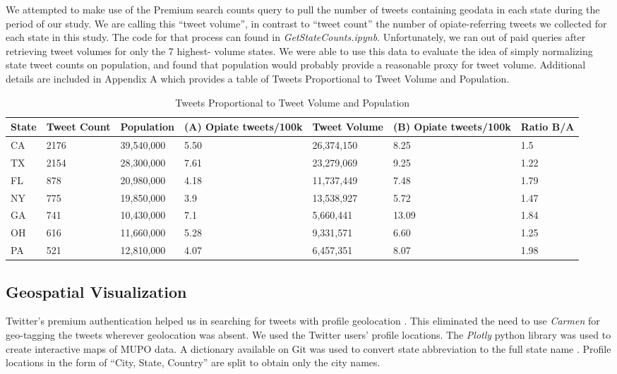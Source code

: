 \documentclass[sigconf]{acmart}
\begin{document}
We attempted to make use of the Premium search counts query to pull the number 
of tweets containing geodata in each state during the period of our study. 
We are calling this ``tweet volume'', in contrast to ``tweet count'' the number 
of opiate-referring tweets we collected for each state in this study. The code 
for that process can found in \emph{GetStateCounts.ipynb}. Unfortunately, we 
ran out of paid queries after retrieving tweet volumes for only the 7 highest-
volume states. We were able to use this data to evaluate the idea of simply 
normalizing state tweet counts on population, and found that population would 
probably provide a reasonable proxy for tweet volume. Additional details are 
included in Appendix A which provides a table of Tweets Proportional to Tweet 
Volume and Population.

\begin{table}[ht]
\centering
\caption{Tweets Proportional to Tweet Volume and Population}
\label{tab:1}
  \begin{tabular}{lllllll}
    \toprule
    State & Tweet Count & Population & (A) Opiate tweets/100k & Tweet Volume & 
    (B) Opiate tweets/100k & Ratio B/A \\
    \midrule     
    CA& 2176& 39,540,000& 5.50& 26,374,150& 8.25& 1.5 \\
    TX& 2154& 28,300,000& 7.61& 23,279,069& 9.25& 1.22 \\
    FL& 878& 20,980,000& 4.18& 11,737,449& 7.48& 1.79 \\
    NY& 775& 19,850,000& 3.9& 13,538,927& 5.72& 1.47 \\
    GA& 741& 10,430,000& 7.1& 5,660,441& 13.09& 1.84 \\
    OH& 616& 11,660,000& 5.28& 9,331,571& 6.60 & 1.25 \\
    PA& 521& 12,810,000& 4.07& 6,457,351& 8.07& 1.98 \\	
    \bottomrule
  \end{tabular}
\end{table}


\subsection{Geospatial Visualization}

Twitter's premium authentication helped us in searching for tweets with 
profile geolocation \cite{twittergeo}. This eliminated the need to use 
\emph{Carmen} \cite{dredze13} for geo-tagging the tweets wherever geolocation 
was absent. We used the Twitter users' profile locations. The \emph{Plotly} python 
library was used to create interactive maps of MUPO data. A dictionary available on 
Git was used to convert state abbreviation to the full state name \cite{CodeRef1}. 
Profile locations in the form of ``City, State, Country'' are split to obtain 
only the city names. 
\end{document}
